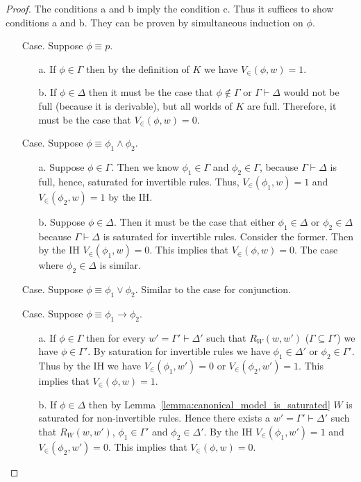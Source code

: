 \documentclass{article}
\begin{document}
\begin{proof}
  The conditions a and b imply the condition c. Thus it suffices to show conditions 
  a and b. They can be proven by simultaneous induction on $\phi$. 
  \begin{itemize}
  \item[Case.] Suppose $\phi \equiv p$.  
    \begin{itemize}
    \item[a.] If $\phi \in \Gamma$ then by the definition of $K$ we have 
      $V_\in(\phi,w) = 1$.
    \item[b.] If $\phi \in \Delta$ then it must be the case
    that $\phi \not\in \Gamma$ or $\Gamma \vdash \Delta$ would not be full (because it
    is derivable), but all worlds of $K$ are full.  Therefore, it must be the case
    that $V_\in(\phi,w) = 0$.
    \end{itemize}

    
  \item[Case.] Suppose $\phi \equiv \phi_1 \land \phi_2$.
    \begin{itemize}
    \item[a.] Suppose $\phi \in \Gamma$.  Then we know $\phi_1 \in \Gamma$
      and $\phi_2 \in \Gamma$, because $\Gamma \vdash \Delta$ is full, hence,
      saturated for invertible rules. Thus, $V_\in(\phi_1,w) = 1$ and $V_\in(\phi_2,w) = 1$
      by the IH.
      
    \item[b.] Suppose $\phi \in \Delta$. Then it must be the case that 
      either $\phi_1 \in \Delta$ or $\phi_2 \in \Delta$ because $\Gamma \vdash \Delta$
      is saturated for invertible rules.  Consider the former.  Then by the IH 
      $V_\in(\phi_1,w) = 0$.  This implies that $V_\in(\phi,w) = 0$.  The case 
      where $\phi_2 \in \Delta$ is similar.
    \end{itemize}

  \item[Case.] Suppose $\phi \equiv \phi_1 \lor \phi_2$.  Similar to the case for conjunction.
    
  \item[Case.] Suppose $\phi \equiv \phi_1 \to \phi_2$.
    \begin{itemize}
    \item[a.] If $\phi \in \Gamma$ then for every $w' = \Gamma' \vdash \Delta'$ such that $R_W(w,w')$ ($\Gamma \subseteq \Gamma'$)
      we have $\phi \in \Gamma'$.  By saturation for invertible rules we have $\phi_1 \in \Delta'$ or $\phi_2 \in \Gamma'$.  
      Thus by the IH we have $V_\in(\phi_1,w') = 0$ or $V_\in(\phi_2,w') = 1$.  This implies that $V_\in(\phi,w) = 1$.

    \item[b.] If $\phi \in \Delta$ then by Lemma~\ref{lemma:canonical_model_is_saturated} $W$ is saturated for non-invertible
      rules.  Hence there exists a $w' = \Gamma' \vdash \Delta'$ such that $R_W(w,w')$, $\phi_1 \in \Gamma'$ and $\phi_2 \in \Delta'$.
      By the IH $V_\in(\phi_1,w') = 1$ and $V_\in(\phi_2,w') = 0$.  This implies that $V_\in(\phi,w) = 0$.
    \end{itemize}    
  \end{itemize}
\end{proof}
\end{document}
